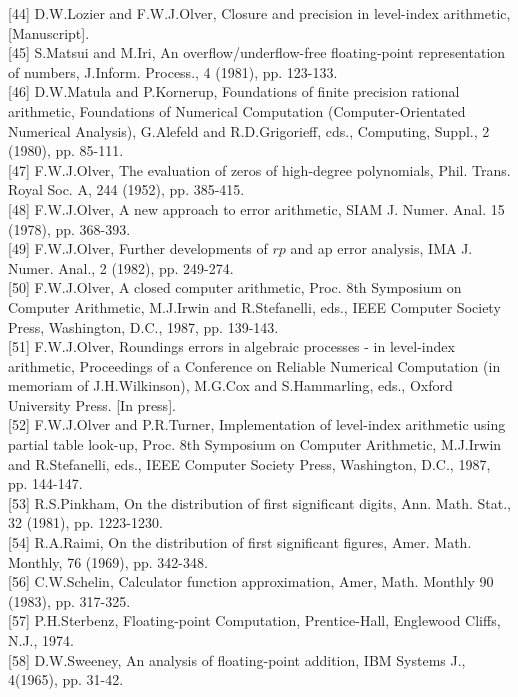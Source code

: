 \documentclass[10pt]{article}
\begin{document}
[44] D.W.Lozier and F.W.J.Olver, Closure and precision in level-index arithmetic, [Manuscript].\\[0pt]
[45] S.Matsui and M.Iri, An overflow/underflow-free floating-point representation of numbers, J.Inform. Process., 4 (1981), pp. 123-133.\\[0pt]
[46] D.W.Matula and P.Kornerup, Foundations of finite precision rational arithmetic, Foundations of Numerical Computation (Computer-Orientated Numerical Analysis), G.Alefeld and R.D.Grigorieff, cds., Computing, Suppl., 2 (1980), pp. 85-111.\\[0pt]
[47] F.W.J.Olver, The evaluation of zeros of high-degree polynomials, Phil. Trans. Royal Soc. A, 244 (1952), pp. 385-415.\\[0pt]
[48] F.W.J.Olver, A new approach to error arithmetic, SIAM J. Numer. Anal. 15 (1978), pp. 368-393.\\[0pt]
[49] F.W.J.Olver, Further developments of $r p$ and ap error analysis, IMA J. Numer. Anal., 2 (1982), pp. 249-274.\\[0pt]
[50] F.W.J.Olver, A closed computer arithmetic, Proc. 8th Symposium on Computer Arithmetic, M.J.Irwin and R.Stefanelli, eds., IEEE Computer Society Press, Washington, D.C., 1987, pp. 139-143.\\[0pt]
[51] F.W.J.Olver, Roundings errors in algebraic processes - in level-index arithmetic, Proceedings of a Conference on Reliable Numerical Computation (in memoriam of J.H.Wilkinson), M.G.Cox and S.Hammarling, eds., Oxford University Press. [In press].\\[0pt]
[52] F.W.J.Olver and P.R.Turner, Implementation of level-index arithmetic using partial table look-up, Proc. 8th Symposium on Computer Arithmetic, M.J.Irwin and R.Stefanelli, eds., IEEE Computer Society Press, Washington, D.C., 1987, pp. 144-147.\\[0pt]
[53] R.S.Pinkham, On the distribution of first significant digits, Ann. Math. Stat., 32 (1981), pp. 1223-1230.\\[0pt]
[54] R.A.Raimi, On the distribution of first significant figures, Amer. Math. Monthly, 76 (1969), pp. 342-348.\\[0pt]
[56] C.W.Schelin, Calculator function approximation, Amer, Math. Monthly 90 (1983), pp. 317-325.\\[0pt]
[57] P.H.Sterbenz, Floating-point Computation, Prentice-Hall, Englewood Cliffs, N.J., 1974.\\[0pt]
[58] D.W.Sweeney, An analysis of floating-point addition, IBM Systems J., 4(1965), pp. 31-42.\\[0pt]
\end{document}
